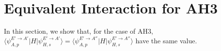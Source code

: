 \documentclass{article}
\begin{document}
\section{Equivalent Interaction for AH3}
In this section, we show that, for the case of AH3, 
$\langle \psi^{E'\to A'}_{A,p} | H | \psi^{E'\to A'}_{H,s} \rangle = \langle \psi^{E'\to A''}_{A,p} | H | \psi^{E'\to A''}_{H,s} \rangle$
have the same value.
\end{document}
